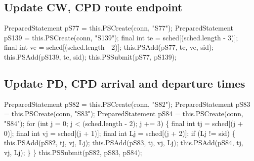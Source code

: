 \subsection{Update CW, CPD route endpoint}
\nwenddocs{}\endmoddef{}
PreparedStatement pS77 = this.PSCreate(conn, "S77");
PreparedStatement pS139 = this.PSCreate(conn, "S139");
final int te = sched[(sched.length - 3)];
final int ve = sched[(sched.length - 2)];
this.PSAdd(pS77, te, ve, sid);
this.PSAdd(pS139, te, sid);
this.PSSubmit(pS77, pS139);
\nwendcode{}\nwdocspar

\subsection{Update PD, CPD arrival and departure times}
\nwenddocs{}\endmoddef{}
PreparedStatement pS82 = this.PSCreate(conn, "S82");
PreparedStatement pS83 = this.PSCreate(conn, "S83");
PreparedStatement pS84 = this.PSCreate(conn, "S84");
for (int j = 0; j < (sched.length - 2); j += 3) \{
  final int tj = sched[(j + 0)];
  final int vj = sched[(j + 1)];
  final int Lj = sched[(j + 2)];
  if (Lj != sid) \{
    this.PSAdd(pS82, tj, vj, Lj);
    this.PSAdd(pS83, tj, vj, Lj);
    this.PSAdd(pS84, tj, vj, Lj);
  \}
\}
this.PSSubmit(pS82, pS83, pS84);
\nwendcode{}\nwdocspar

